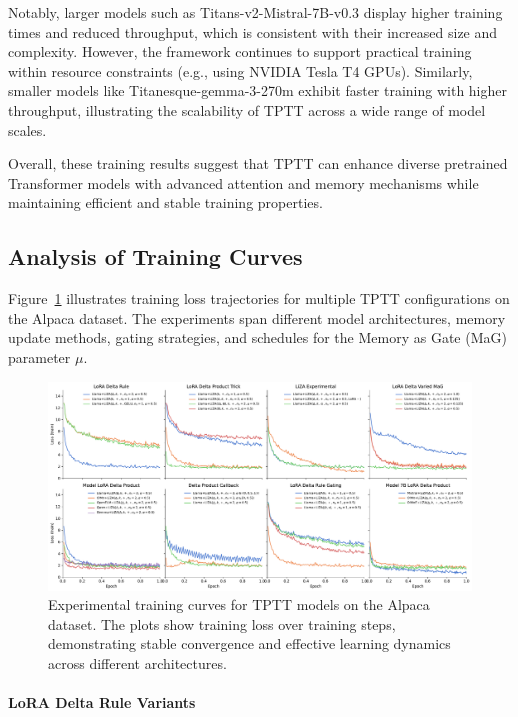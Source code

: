 \documentclass[10pt,a4paper]{article}
\begin{document}
Notably, larger models such as Titans-v2-Mistral-7B-v0.3 display higher training times and reduced throughput, which is consistent with their increased size and complexity. However, the framework continues to support practical training within resource constraints (e.g., using NVIDIA Tesla T4 GPUs). Similarly, smaller models like Titanesque-gemma-3-270m exhibit faster training with higher throughput, illustrating the scalability of TPTT across a wide range of model scales.

Overall, these training results suggest that TPTT can enhance diverse pretrained Transformer models with advanced attention and memory mechanisms while maintaining efficient and stable training properties.


\subsection{Analysis of Training Curves}

Figure~\ref{fig:training_curve} illustrates training loss trajectories for multiple TPTT configurations on the Alpaca dataset. The experiments span different model architectures, memory update methods, gating strategies, and schedules for the Memory as Gate (MaG) parameter \(\mu\).


\begin{figure}[ht]
    \centering
    \includegraphics[width=1.0\linewidth]{plot.pdf}
    \caption{Experimental training curves for TPTT models on the Alpaca dataset. The plots show training loss over training steps, demonstrating stable convergence and effective learning dynamics across different architectures.}
    \label{fig:training_curve}
\end{figure}


\paragraph{LoRA Delta Rule Variants}
\end{document}
